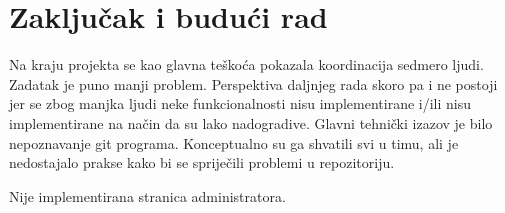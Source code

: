 \chapter{Zaključak i budući rad}


		Na kraju projekta se kao glavna teškoća pokazala koordinacija sedmero ljudi. Zadatak je puno manji problem. Perspektiva daljnjeg rada skoro pa i ne postoji jer se zbog manjka ljudi neke funkcionalnosti nisu implementirane i/ili nisu implementirane na način da su lako nadogradive. Glavni tehnički izazov je bilo nepoznavanje git programa. Konceptualno su ga shvatili svi u timu, ali je nedostajalo prakse kako bi se spriječili problemi u repozitoriju.
		
		
		
		Nije implementirana stranica administratora.
		\eject 
